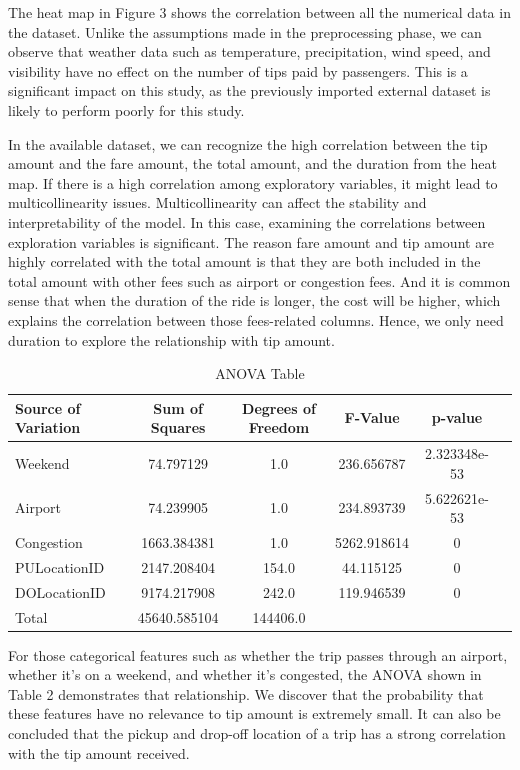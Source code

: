 \documentclass[11pt]{article}
\begin{document}
The heat map in Figure 3 shows the correlation between all the numerical data in the dataset.
Unlike the assumptions made in the preprocessing phase, we can observe that weather data such as temperature, precipitation, wind speed, and visibility have no effect on the number of tips paid by passengers. This is a significant impact on this study, as the previously imported external dataset is likely to perform poorly for this study. 

In the available dataset, we can recognize the high correlation between the tip amount and the fare amount, the total amount, and the duration from the heat map. If there is a high correlation among exploratory variables, it might lead to multicollinearity issues. Multicollinearity can affect the stability and interpretability of the model. In this case, examining the correlations between exploration variables is significant. The reason fare amount and tip amount are highly correlated with the total amount is that they are both included in the total amount with other fees such as airport or congestion fees. And it is common sense that when the duration of the ride is longer, the cost will be higher, which explains the correlation between those fees-related columns. Hence, we only need duration to explore the relationship with tip amount.

\begin{table}[ht]
\centering
\begin{tabular}{@{}lccccc@{}}
\toprule
Source of Variation & Sum of Squares & Degrees of Freedom & F-Value & p-value \\
\midrule
Weekend & 74.797129 & 1.0 & 236.656787 & 2.323348e-53 \\
Airport & 74.239905 & 1.0 & 234.893739 & 5.622621e-53\\
Congestion & 1663.384381 & 1.0 & 5262.918614 & 0\\
PULocationID & 2147.208404 & 154.0 & 44.115125 & 0\\
DOLocationID & 9174.217908 & 242.0 & 119.946539 & 0\\
Total & 45640.585104 & 144406.0 & & \\
\bottomrule
\end{tabular}
\caption{ANOVA Table}
\end{table}

For those categorical features such as whether the trip passes through an airport, whether it's on a weekend, and whether it's congested, the ANOVA shown in Table 2 demonstrates that relationship. We discover that the probability that these features have no relevance to tip amount is extremely small. It can also be concluded that the pickup and drop-off location of a trip has a strong correlation with the tip amount received. 
\end{document}
